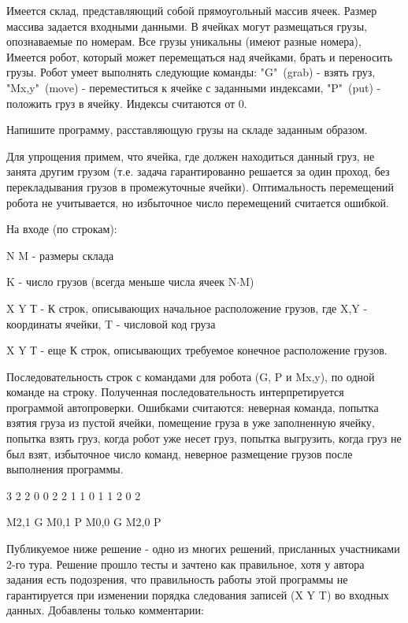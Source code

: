 
Имеется склад, представляющий собой прямоугольный массив ячеек. Размер массива задается входными данными. В ячейках могут размещаться грузы, опознаваемые по номерам. Все грузы уникальны (имеют разные номера), Имеется робот, который может перемещаться над ячейками, брать и переносить грузы. Робот умеет выполнять следующие команды:  "G"\ (grab) - взять груз, "Mx,y"\ (move) - переместиться к ячейке с заданными индексами, "P"\ (put) - положить груз в ячейку.  Индексы считаются от 0.

Напишите программу, расставляющую грузы на складе заданным образом.

Для упрощения примем, что ячейка, где должен находиться данный груз, не занята другим грузом (т.е. задача гарантированно решается за один проход, без перекладывания грузов в промежуточные ячейки). Оптимальность перемещений робота не учитывается, но избыточное число перемещений считается ошибкой.

На входе (по строкам):  

N M - размеры склада

K  - число грузов (всегда меньше числа ячеек N$\cdot$M)

X Y Т  - К строк, описывающих начальное расположение грузов, где X,Y - координаты ячейки, T - числовой код груза

X Y Т - еще К строк, описывающих требуемое конечное расположение грузов.

\outputfmtSection
Последовательность строк с командами для робота (G, P и Mx,y), по одной команде на строку. Полученная последовательность интерпретируется программой автопроверки. Ошибками считаются: неверная команда, попытка взятия груза из пустой ячейки, помещение груза в уже заполненную ячейку, попытка взять груз, когда робот уже несет груз, попытка выгрузить, когда груз не был взят, избыточное число команд, неверное размещение грузов после выполнения программы.

\begin{myverbbox}[\small]{\vinput}
    3 2
    2
    0 0 2
    2 1 1
    0 1 1
    2 0 2
\end{myverbbox}
\begin{myverbbox}[\small]{\voutput}
    M2,1
    G
    M0,1
    P
    M0,0
    G
    M2,0
    P
\end{myverbbox}

\solutionSection

Публикуемое ниже решение - одно из многих решений, присланных участниками 2-го тура.  Решение прошло тесты и зачтено как правильное, хотя у автора задания есть подозрения, что правильность работы этой программы не гарантируется при изменении порядка следования записей (X Y T) во входных данных. Добавлены только комментарии:

